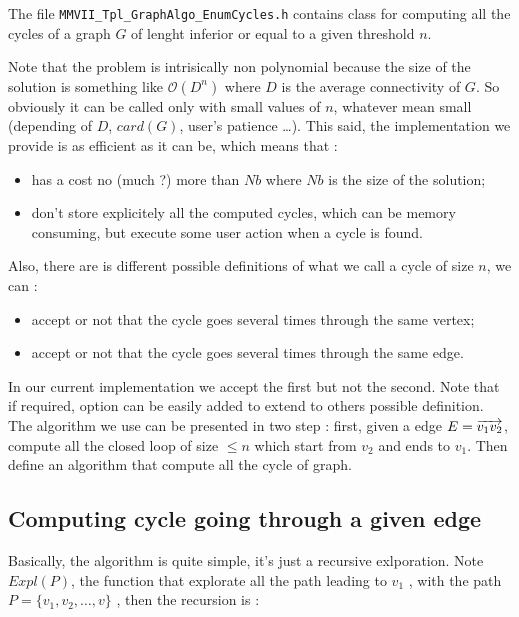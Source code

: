 The file {\tt MMVII\_Tpl\_GraphAlgo\_EnumCycles.h} contains class for computing all the
cycles of a graph $G$  of lenght inferior or equal to a given threshold $n$. 

Note that the problem is intrisically non polynomial because the size of the solution
is something like $\mathcal{O}(D^n)$ where $D$ is the average connectivity of $G$. So
obviously it can be called only with small values of $n$, whatever mean small (depending
of $D$, $card(G)$, user's patience \dots).  This said, the implementation we provide
is as efficient as it can be, which means that :


\begin{itemize}
   \item  has a cost no (much ?)  more than $Nb$ where $Nb$ is the size of the solution;
   \item  don't store explicitely all the computed cycles, which can be memory consuming, but 
          execute some user action when a cycle is found.
\end{itemize}

Also, there are is different possible definitions of what we call a cycle of size $n$, we can :

\begin{itemize}
   \item  accept or not that the cycle goes several times through the same vertex;
   \item  accept or not that the cycle goes several times through the same edge.
\end{itemize}

In our current implementation we accept the first but not the second.  Note that if required,
option  can be easily added to  extend to others possible definition.
The algorithm we use can be presented in two step : first, given a edge $E=\overrightarrow{v_1 v_2}$, compute all the
closed loop of size $\leq n$ which start from $v_2$ and ends to $v_1$.  Then define an algorithm
that compute all the cycle of graph.



\subsection{Computing cycle going through a given edge}

\label{Graph:AlgoEC:OneEdge}

Basically, the algorithm is quite simple, it's just a recursive exlporation. Note
$Expl(P)$, the function that explorate all the path leading to $v_1$ ,  with the path $P =\{v_1,v_2,\dots,v\}$ ,
then the recursion is :

